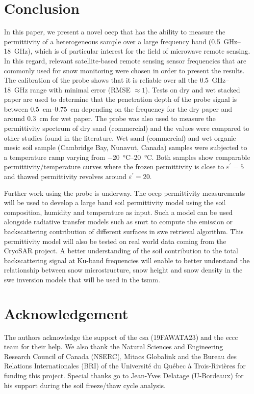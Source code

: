 \section{Conclusion}
In this paper, we present a novel \acl{oecp} that has the ability to measure the permittivity of a heterogeneous sample over a large frequency band (\qtyrange{0.5}{18}{\giga\hertz}), which is of particular interest for the field of microwave remote sensing.
In this regard, relevant satellite-based remote sensing sensor frequencies that are commonly used for snow monitoring were chosen in order to present the results.
The calibration of the probe shows that it is reliable over all the \qtyrange{0.5}{18}{\giga\hertz} range with minimal error (RMSE \(\approx1\)).
Tests on dry and wet stacked paper are used to determine that the penetration depth of the probe signal is between \qtyrange{0.5}{0.75}{\cm} depending on the frequency for the dry paper and around \qty{0.3}{\cm} for wet paper.
The probe was also used to measure the permittivity spectrum of dry sand (commercial) and the values were compared to other studies found in the literature.
Wet sand (commercial) and wet organic mesic soil sample (Cambridge Bay, Nunavut, Canada) samples were subjected to a temperature ramp varying from \qtyrange{-20}{20}{\degreeCelsius}.
Both samples show comparable permittivity/temperature curves where the frozen permittivity is close to \(\varepsilon^\prime = 5\) and thawed permittivity revolves around \(\varepsilon^\prime = 20\).

Further work using the probe is underway.
The \ac{oecp} permittivity measurements will be used to develop a large band soil permittivity model using the soil composition, humidity and temperature as input.
Such a model can be used alongside radiative transfer models such as \acl{smrt} to compute the emission or backscattering contribution of different surfaces in \acl{swe} retrieval algorithm.
This permittivity model will also be tested on real world data coming from the CryoSAR project.
A better understanding of the soil contribution to the total backscattering signal at Ku-band frequencies will enable to better understand the relationship between snow microstructure, snow height and snow density in the \ac{swe} inversion models that will be used in the \acl{tsmm}.

\section{Acknowledgement}
The authors acknowledge the support of the \acl{csa} (19FAWATA23) and the \acl{eccc} team for their help.
We also thank the Natural Sciences and Engineering Research Council of Canada (NSERC), Mitacs Globalink and the Bureau des Relations Internationales (BRI) of the Université du Québec à Trois-Rivières for funding this project. 
Special thanks go to Jean-Yves Delatage (U-Bordeaux) for his support during the soil freeze/thaw cycle analysis.
